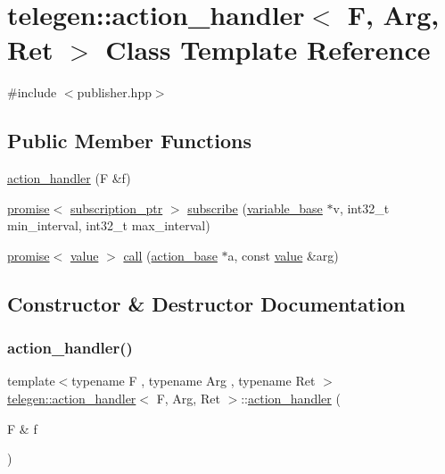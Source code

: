 \hypertarget{classtelegen_1_1action__handler}{}\section{telegen\+:\+:action\+\_\+handler$<$ F, Arg, Ret $>$ Class Template Reference}
\label{classtelegen_1_1action__handler}


{\ttfamily \#include $<$publisher.\+hpp$>$}

\subsection*{Public Member Functions}
\begin{DoxyCompactItemize}
\item 
\hyperlink{classtelegen_1_1action__handler_a4fd774bba853a38a28e38b4684390a87}{action\+\_\+handler} (F \&f)
\item 
\hyperlink{namespacetelegen_a9dd802bb5d30cf96b0c616750d43ae86}{promise}$<$ \hyperlink{namespacetelegen_a27c822534a5231fe1c523c81e8768afb}{subscription\+\_\+ptr} $>$ \hyperlink{classtelegen_1_1action__handler_a8a48009cf9e2893bd2801ab04465ba31}{subscribe} (\hyperlink{classtelegen_1_1variable__base}{variable\+\_\+base} $\ast$v, int32\+\_\+t min\+\_\+interval, int32\+\_\+t max\+\_\+interval)
\item 
\hyperlink{namespacetelegen_a9dd802bb5d30cf96b0c616750d43ae86}{promise}$<$ \hyperlink{classtelegen_1_1value}{value} $>$ \hyperlink{classtelegen_1_1action__handler_af74ede39066de588eb8f51b25d1b96a0}{call} (\hyperlink{classtelegen_1_1action__base}{action\+\_\+base} $\ast$a, const \hyperlink{classtelegen_1_1value}{value} \&arg)
\end{DoxyCompactItemize}


\subsection{Constructor \& Destructor Documentation}
\mbox{\label{classtelegen_1_1action__handler_a4fd774bba853a38a28e38b4684390a87}} 
\subsubsection{\texorpdfstring{action\+\_\+handler()}{action\_handler()}}
{\footnotesize\ttfamily template$<$typename F , typename Arg , typename Ret $>$ \\
\hyperlink{classtelegen_1_1action__handler}{telegen\+::action\+\_\+handler}$<$ F, Arg, Ret $>$\+::\hyperlink{classtelegen_1_1action__handler}{action\+\_\+handler} (\begin{DoxyParamCaption}\item[{F \&}]{f }\end{DoxyParamCaption})\hspace{0.3cm}{\ttfamily [inline]}}



